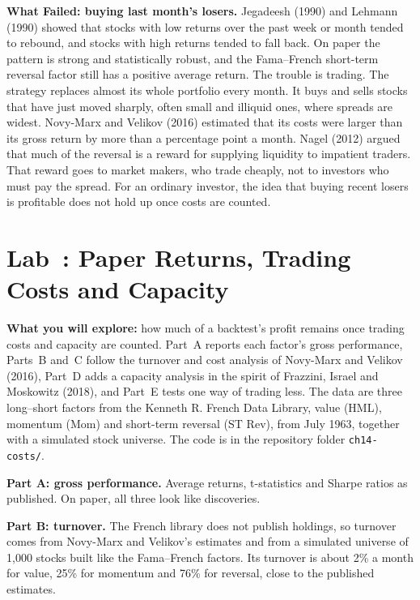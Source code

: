 \begin{callout}
\textbf{What Failed: buying last month's losers.} Jegadeesh (1990) and Lehmann (1990) showed that stocks with low returns over the past week or month tended to rebound, and stocks with high returns tended to fall back. On paper the pattern is strong and statistically robust, and the Fama--French short-term reversal factor still has a positive average return. The trouble is trading. The strategy replaces almost its whole portfolio every month. It buys and sells stocks that have just moved sharply, often small and illiquid ones, where spreads are widest. Novy-Marx and Velikov (2016) estimated that its costs were larger than its gross return by more than a percentage point a month. Nagel (2012) argued that much of the reversal is a reward for supplying liquidity to impatient traders. That reward goes to market makers, who trade cheaply, not to investors who must pay the spread. For an ordinary investor, the idea that buying recent losers is profitable does not hold up once costs are counted.
\end{callout}

\section{Lab~\thechapter: Paper Returns, Trading Costs and Capacity}
\label{sec:17-lab}

\textbf{What you will explore:} how much of a backtest's profit remains once trading costs and capacity are counted. Part~A reports each factor's gross performance, Parts~B and~C follow the turnover and cost analysis of Novy-Marx and Velikov (2016), Part~D adds a capacity analysis in the spirit of Frazzini, Israel and Moskowitz (2018), and Part~E tests one way of trading less. The data are three long--short factors from the Kenneth R. French Data Library, value (HML), momentum (Mom) and short-term reversal (ST Rev), from July 1963, together with a simulated stock universe. The code is in the repository folder \texttt{ch14-costs/}.

\textbf{Part A: gross performance.} Average returns, t-statistics and Sharpe ratios as published. On paper, all three look like discoveries.

\textbf{Part B: turnover.} The French library does not publish holdings, so turnover comes from Novy-Marx and Velikov's estimates and from a simulated universe of 1,000 stocks built like the Fama--French factors. Its turnover is about 2\% a month for value, 25\% for momentum and 76\% for reversal, close to the published estimates.

